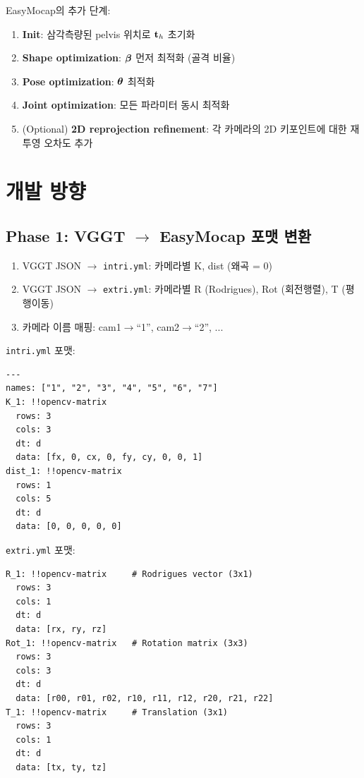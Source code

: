 \documentclass[11pt, a4paper]{report}
\begin{document}
EasyMocap의 추가 단계:
\begin{enumerate}[leftmargin=*]
  \item \textbf{Init}: 삼각측량된 pelvis 위치로 $\mathbf{t}_h$ 초기화
  \item \textbf{Shape optimization}: $\bm{\beta}$ 먼저 최적화 (골격 비율)
  \item \textbf{Pose optimization}: $\bm{\theta}$ 최적화
  \item \textbf{Joint optimization}: 모든 파라미터 동시 최적화
  \item (Optional) \textbf{2D reprojection refinement}: 각 카메라의 2D 키포인트에 대한 재투영 오차도 추가
\end{enumerate}


\chapter{개발 방향}

\section{Phase 1: VGGT $\rightarrow$ EasyMocap 포맷 변환}

\begin{setupbox}[title={변환 요구사항}]
\begin{enumerate}[leftmargin=*]
  \item VGGT JSON $\rightarrow$ \texttt{intri.yml}: 카메라별 K, dist (왜곡 = 0)
  \item VGGT JSON $\rightarrow$ \texttt{extri.yml}: 카메라별 R (Rodrigues), Rot (회전행렬), T (평행이동)
  \item 카메라 이름 매핑: cam1$\rightarrow$``1'', cam2$\rightarrow$``2'', ...
\end{enumerate}
\end{setupbox}

\texttt{intri.yml} 포맷:
\begin{lstlisting}[language={}]
%YAML:1.0
---
names: ["1", "2", "3", "4", "5", "6", "7"]
K_1: !!opencv-matrix
  rows: 3
  cols: 3
  dt: d
  data: [fx, 0, cx, 0, fy, cy, 0, 0, 1]
dist_1: !!opencv-matrix
  rows: 1
  cols: 5
  dt: d
  data: [0, 0, 0, 0, 0]
\end{lstlisting}

\texttt{extri.yml} 포맷:
\begin{lstlisting}[language={}]
R_1: !!opencv-matrix     # Rodrigues vector (3x1)
  rows: 3
  cols: 1
  dt: d
  data: [rx, ry, rz]
Rot_1: !!opencv-matrix   # Rotation matrix (3x3)
  rows: 3
  cols: 3
  dt: d
  data: [r00, r01, r02, r10, r11, r12, r20, r21, r22]
T_1: !!opencv-matrix     # Translation (3x1)
  rows: 3
  cols: 1
  dt: d
  data: [tx, ty, tz]
\end{lstlisting}
\end{document}
